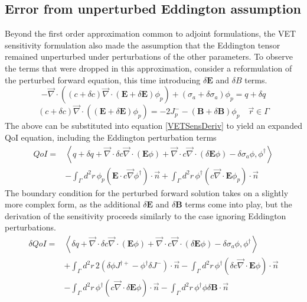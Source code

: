 \documentclass{article}
\newcommand{\vr}{\vec{r}}
\newcommand{\bra}{\left\langle}
\newcommand{\ket}{\right\rangle}
\newcommand{\vdiv}{\vec{\nabla} \cdot}
\newcommand{\vgrad}{\vec{\nabla}}
\newcommand{\Edd}{\mathbf{E}}
\newcommand{\BEdd}{\mathbf{B}}
\newcommand{\siga}{\sigma_a}
\newcommand{\isigt}{c}
\newcommand{\scalSource}{q}
\begin{document}
\subsection{Error from unperturbed Eddington assumption}
Beyond the first order approximation common to adjoint formulations, the VET sensitivity formulation also made the assumption that the Eddington tensor remained unperturbed under perturbations of the other parameters. To observe the terms that were dropped in this approximation, consider a reformulation of the perturbed forward equation, this time introducing $\delta \Edd$ and $\delta  B$ terms. 
\begin{equation}
\label{VEFPerEdd}
- \vdiv \left((\isigt + \delta \isigt)\vdiv (\Edd + \delta \Edd) \phi_p \right) + (\siga + \delta \siga)\phi_p = \scalSource + \delta \scalSource
\end{equation}
\begin{equation}
(\isigt + \delta \isigt) \vec{\nabla} \cdot \left((\Edd + \delta \Edd) \phi_p \right)  = - 2J_p^- - (\BEdd +\delta \BEdd) \phi_p \quad \vr \in \Gamma
\end{equation}
The above can be substituted into equation \ref{VETSensDeriv} to yield an expanded QoI equation, including the Eddington perturbation terms
\begin{equation}
\label{QoIVETAdjNoBCEdd}
\begin{split}
QoI =& \bra \scalSource + \delta \scalSource + \vdiv \delta \isigt \vdiv \left( \Edd \phi \right) + \vdiv \isigt \vdiv \left( \delta \Edd \phi \right) - \delta \siga \phi, \phi^\dag \ket \\
&- \int_\Gamma d^2 r \, \phi_p \left( \Edd \cdot \isigt \vgrad \phi^\dag \right) \cdot \vec{n} 
+ \int_\Gamma d^2 r \, \phi^\dag \left(  \isigt \vdiv \Edd \phi_p \right) \cdot \vec{n} 
\end{split}
\end{equation}
The boundary condition for the perturbed forward solution takes on a slightly more complex form, as the additional $\delta \Edd$ and $\delta \BEdd$ terms come into play, but the derivation of the sensitivity proceeds similarly to the case ignoring Eddington perturbations.
\begin{equation}
\label{QoIVETAdjEdd}
\begin{split}
\delta QoI =& \bra \delta \scalSource + \vdiv \delta \isigt \vdiv \left( \Edd \phi \right) + \vdiv \isigt \vdiv \left( \delta \Edd \phi \right) - \delta \siga \phi, \phi^\dag \ket \\
&+ \int_\Gamma d^2 r \, 2  \left( \delta \phi J^{\dag +}  - \phi^\dag \delta J^- \right) \cdot \vec{n}
- \int_\Gamma d^2 r \,  \phi^\dag \left( \delta \isigt \vdiv \Edd \phi \right) \cdot \vec{n}
\\
&- \int_\Gamma d^2 r \,  \phi^\dag \left( \isigt \vdiv \delta \Edd \phi \right) \cdot \vec{n}
- \int_\Gamma d^2 r \,  \phi^\dag \phi \delta \BEdd \cdot \vec{n}
\end{split}
\end{equation} 
\end{document}
